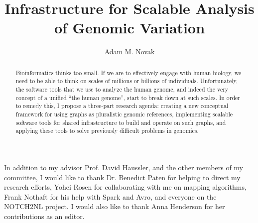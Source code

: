 \documentclass[11pt,proposal]{ucthesis}
\begin{document}
\newcommand{\vocab}[1]{\textbf{#1}\xspace}


\title{Infrastructure for Scalable Analysis of Genomic Variation}
\author{Adam M. Novak}
\deanlinethree{}

\begin{frontmatter}

\maketitle
\copyrightpage

\tableofcontents
\listoffigures
\listoftables

\begin{abstract}
    Bioinformatics thinks too small. If we are to effectively engage with human biology, we need to be able to think on scales of millions or billions of individuals. Unfortunately, the software tools that we use to analyze the human genome, and indeed the very concept of a unified ``the human genome'', start to break down at such scales. In order to remedy this, I propose a three-part research agenda: creating a new conceptual framework for using graphs as pluralistic genomic references, implementing scalable software tools for shared infrastructure to build and operate on such graphs, and applying these tools to solve previously difficult problems in genomics.
\end{abstract}

\begin{acknowledgements}
In addition to my advisor Prof. David Haussler, and the other members of my committee, I would like to thank Dr. Benedict Paten for helping to direct my research efforts, Yohei Rosen for collaborating with me on mapping algorithms, Frank Nothaft for his help with Spark and Avro, and everyone on the NOTCH2NL project. I would also like to thank Anna Henderson for her contributions as an editor.
\end{acknowledgements}

\end{frontmatter}
\end{document}
